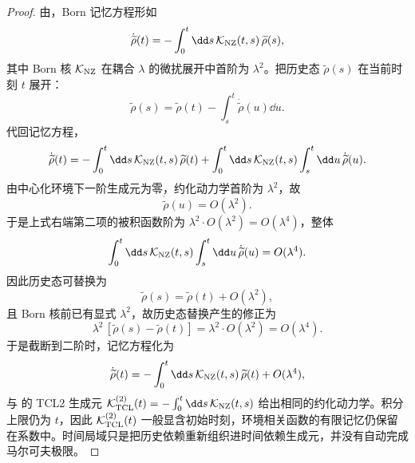 \begin{proof}
由，Born 记忆方程形如
\begin{equation*}
 \dot{\widetilde\rho}(t)
 =-\int_0^t\dd s\,\mathcal K_{\rm NZ}(t,s)\,\widetilde\rho(s),
\end{equation*}
其中 Born 核 \(\mathcal K_{\rm NZ}\) 在耦合 \(\lambda\) 的微扰展开中首阶为 \(\lambda^2\)。把历史态 \(\widetilde\rho(s)\) 在当前时刻 \(t\) 展开：
\begin{equation*}
 \widetilde\rho(s)
 =\widetilde\rho(t)-\int_s^t\dot{\widetilde\rho}(u)\dd u.
\end{equation*}
代回记忆方程，
\begin{equation*}
 \dot{\widetilde\rho}(t)
 =-\int_0^t\dd s\,\mathcal K_{\rm NZ}(t,s)\,\widetilde\rho(t)
 +\int_0^t\dd s\,\mathcal K_{\rm NZ}(t,s)\int_s^t\dd u\,\dot{\widetilde\rho}(u).
\end{equation*}
由中心化环境下一阶生成元为零，约化动力学首阶为 \(\lambda^2\)，故
\begin{equation*}
 \dot{\widetilde\rho}(u)=O(\lambda^2).
\end{equation*}
于是上式右端第二项的被积函数阶为 \(\lambda^2\cdot O(\lambda^2)=O(\lambda^4)\)，整体
\begin{equation*}
 \int_0^t\dd s\,\mathcal K_{\rm NZ}(t,s)\int_s^t\dd u\,\dot{\widetilde\rho}(u)
 =O(\lambda^4).
\end{equation*}
因此历史态可替换为
\begin{equation*}
 \widetilde\rho(s)
 =\widetilde\rho(t)+O(\lambda^2),
\end{equation*}
且 Born 核前已有显式 \(\lambda^2\)，故历史态替换产生的修正为
\begin{equation*}
 \lambda^2\,[\widetilde\rho(s)-\widetilde\rho(t)]
 =\lambda^2\cdot O(\lambda^2)=O(\lambda^4).
\end{equation*}
于是截断到二阶时，记忆方程化为
\begin{equation*}
 \dot{\widetilde\rho}(t)
 =-\int_0^t\dd s\,\mathcal K_{\rm NZ}(t,s)\,\widetilde\rho(t)+O(\lambda^4),
\end{equation*}
与 的 TCL2 生成元 \(\mathcal K_{\rm TCL}^{(2)}(t)=-\int_0^t\dd s\,\mathcal K_{\rm NZ}(t,s)\) 给出相同的约化动力学。积分上限仍为 \(t\)，因此 \(\mathcal K_{\rm TCL}^{(2)}(t)\) 一般显含初始时刻，环境相关函数的有限记忆仍保留在系数中。时间局域只是把历史依赖重新组织进时间依赖生成元，并没有自动完成马尔可夫极限。
\end{proof}

